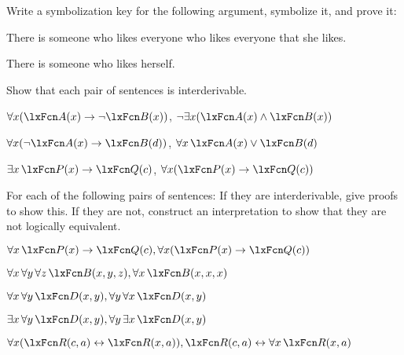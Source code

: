 \solutions
\problempart
\label{pr.likes}
Write a symbolization key for the following argument, symbolize it, and prove it:
\begin{earg}
\item There is someone who likes everyone who likes everyone that she
likes. 
\item[\texttherefore] There is someone who likes herself.
\end{earg}


\problempart
Show that each pair of sentences is interderivable.
\begin{compactlist}
\item $\forall x (\atom{A}{x}\eif \enot \atom{B}{x})$, $\enot\exists x(\atom{A}{x} \eand \atom{B}{x})$
\item $\forall x (\enot\atom{A}{x}\eif \atom{B}{d})$, $\forall x\,\atom{A}{x} \eor \atom{B}{d}$
\item $\exists x\,\atom{P}{x} \eif \atom{Q}{c}$, $\forall x (\atom{P}{x} \eif \atom{Q}{c})$
\end{compactlist}

\solutions
\problempart
\label{pr.FOLequivornot}
For each of the following pairs of sentences: If they are interderivable, give proofs to show this. If they are not, construct an interpretation to show that they are not logically equivalent.
\begin{compactlist}
\item $\forall x\,\atom{P}{x} \eif \atom{Q}{c}, \forall x (\atom{P}{x} \eif \atom{Q}{c})$
\item $\forall x\,\forall y\, \forall z\,\atom{B}{x,y,z}, \forall x\,\atom{B}{x,x,x}$
\item $\forall x\,\forall y\,\atom{D}{x,y}, \forall y\,\forall x\,\atom{D}{x,y}$
\item $\exists x\,\forall y\,\atom{D}{x,y}, \forall y\,\exists x\,\atom{D}{x,y}$
\item $\forall x (\atom{R}{c,a} \eiff \atom{R}{x,a}), \atom{R}{c,a} \eiff \forall x\,\atom{R}{x,a}$
\end{compactlist}

